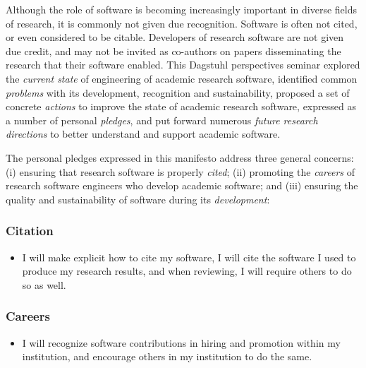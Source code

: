 \documentclass[a4paper,UKenglish]{dagman}
\renewcommand{\paragraph}[1]{\subsubsection*{#1}\xspace}
\begin{document}
Although the role of software is becoming increasingly important in diverse fields of research, it is commonly not given due recognition. Software is often not cited, or even considered to be citable. Developers of research software are not given due credit, and may not be invited as co-authors on papers disseminating the research that their software enabled. 
This Dagstuhl perspectives seminar
explored the \emph{current state} of engineering of academic research software,
identified common \emph{problems} with its development, recognition and sustainability,
proposed a set of concrete \emph{actions} to improve the state of academic research software, expressed as a number of personal \emph{pledges},
and
put forward numerous \emph{future research directions} to better understand and support academic software.

The personal pledges expressed in this manifesto address three general concerns:
(i) ensuring that research software is properly \emph{cited};
(ii) promoting the \emph{careers} of research software engineers who develop academic software;
and
(iii) ensuring the quality and sustainability of software during its \emph{development}:

\paragraph{Citation}
\begin{itemize}
\item I will make explicit how to cite my software, I will cite the software I used to produce my research results, and when reviewing, I will require others to do so as well.
\end{itemize}

\paragraph{Careers}
\begin{itemize}
\item I will recognize software contributions in hiring and promotion within my institution, and encourage others in my institution to do the same.
\end{itemize}
\end{document}
